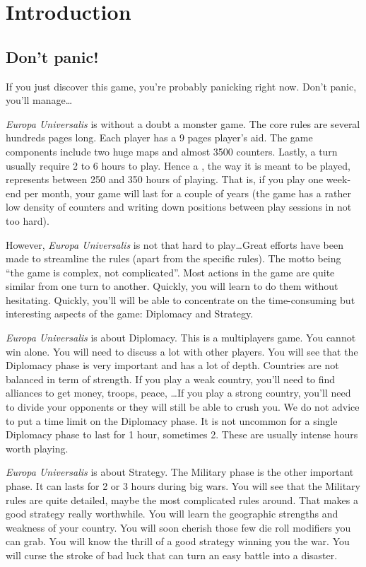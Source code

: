 
\chapter*{Introduction}

\section*{Don't panic!}
If you just discover this game, you're probably panicking right now. Don't
panic, you'll manage\ldots

\emph{Europa Universalis} is without a doubt a monster game. The core rules
are several hundreds pages long. Each player has a 9 pages player's aid. The
game components include two huge maps and almost 3500 counters. Lastly, a turn
usually require 2 to 6 hours to play. Hence a , the way
it is meant to be played, represents between 250 and 350 hours of
playing. That is, if you play one week-end per month, your game will last for
a couple of years (the game has a rather low density of counters and writing
down positions between play sessions in not too hard).

However, \emph{Europa Universalis} is not that hard to play\ldots Great
efforts have been made to streamline the rules (apart from the specific
rules). The motto being ``the game is complex, not complicated''. Most actions
in the game are quite similar from one turn to another. Quickly, you will learn
to do them without hesitating. Quickly, you'll will be able to concentrate on
the time-consuming but interesting aspects of the game: Diplomacy and
Strategy.

\emph{Europa Universalis} is about Diplomacy. This is a multiplayers game. You
cannot win alone. You will need to discuss a lot with other players. You will
see that the Diplomacy phase is very important and has a lot of
depth. Countries are not balanced in term of strength. If you play a weak
country, you'll need to find alliances to get money, troops, peace, \ldots If
you play a strong country, you'll need to divide your opponents or they will
still be able to crush you. We do not advice to put a time limit on the
Diplomacy phase. It is not uncommon for a single Diplomacy phase to last for 1
hour, sometimes 2. These are usually intense hours worth playing.

\emph{Europa Universalis} is about Strategy. The Military phase is the other
important phase. It can lasts for 2 or 3 hours during big wars. You will see
that the Military rules are quite detailed, maybe the most complicated rules
around. That makes a good strategy really worthwhile. You will learn the
geographic strengths and weakness of your country. You will soon cherish those
few  die roll modifiers you can grab. You will know the thrill of a
good strategy winning you the war. You will curse the stroke of bad luck that
can turn an easy battle into a disaster.

